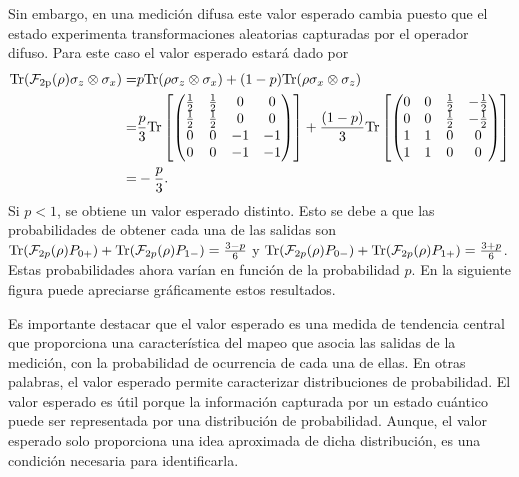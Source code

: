Sin embargo, en una medición difusa este valor esperado cambia puesto que el estado experimenta transformaciones aleatorias capturadas por el operador difuso. Para este caso el valor esperado estará dado por \[\begin{split}{\rm Tr}(\mathcal{F}_{2\text{p}}(\rho)\sigma_z\otimes \sigma_x)=&p{\rm Tr}(\rho\sigma_z\otimes \sigma_x )+(1-p){\rm Tr}(\rho\sigma_x\otimes \sigma_z )\\
    =& \frac{p}{3}{\rm Tr}\left[ \begin{pmatrix}
        \tfrac{1}{2}&\tfrac{1}{2}&0&0\\
        \tfrac{1}{2}&\tfrac{1}{2}&0&0\\
        0&0&-1&-1\\
        0&0&-1&-1\\
    \end{pmatrix}\right]+ \frac{(1-p)}{3}{\rm Tr}\left[ \begin{pmatrix}
        0&0&\tfrac{1}{2}&-\tfrac{1}{2}\\
        0&0&\tfrac{1}{2}&-\tfrac{1}{2}\\
        1&1&0&0\\
        1&1&0&0\\
    \end{pmatrix}\right]\\
    =&-\frac{p}{3}.
\end{split}\]Si $p<1$, se obtiene un valor esperado distinto. Esto se debe a
que las probabilidades de obtener cada una de las salidas son
${\rm Tr}(\mathcal{F}_{2p}(\rho)P_{0+})+{\rm Tr}(\mathcal{F}_{2p}(\rho)P_{1-})=\frac{3-p}{6}$
y
${\rm Tr}(\mathcal{F}_{2p}(\rho)P_{0-})+{\rm Tr}(\mathcal{F}_{2p}(\rho)P_{1+})=\frac{3+p}{6}$.
Estas probabilidades ahora varían en función de la probabilidad $p$. En la
siguiente figura puede apreciarse gráficamente estos resultados.










Es importante destacar que el valor esperado es una medida de tendencia central
que proporciona una característica del mapeo que asocia las salidas de la
medición, con la probabilidad de ocurrencia de cada una de ellas. En otras
palabras, el valor esperado permite caracterizar distribuciones de
probabilidad. El valor esperado es útil porque la información capturada por un
estado cuántico puede ser representada por una distribución de probabilidad.
Aunque, el valor esperado solo proporciona una idea aproximada de dicha
distribución, es una condición necesaria para identificarla. 

